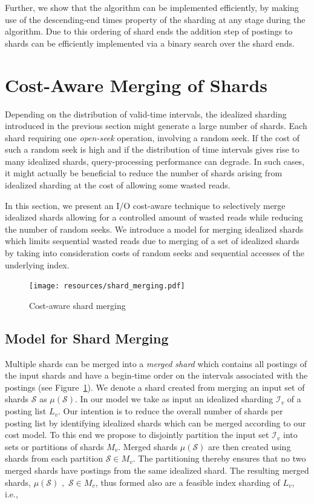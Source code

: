 Further, we show that the algorithm can be implemented efficiently, by
making use of the descending-end times property of the sharding at any stage during the algorithm. Due to this ordering of shard ends the addition step of postings to shards can be efficiently implemented via a binary search over the shard ends.

\section{Cost-Aware Merging of Shards}
\label{chap:sharding:sec:relaxed_part}

Depending on the distribution of valid-time intervals, the idealized
sharding introduced in the previous section might generate a large
number of shards. Each shard requiring one \emph{open-seek} operation, 
involving a random seek.  If the cost of such a random seek is
high and if the distribution of time intervals gives rise to many
idealized shards, query-processing performance can degrade. In such 
cases, it might actually be beneficial to reduce the number of shards 
arising from idealized sharding at the cost of allowing some wasted 
reads.
 
In this section, we present an I/O cost-aware technique to
selectively merge idealized shards allowing for a controlled amount of
wasted reads while reducing the number of random seeks. We introduce a
 model for merging idealized shards which limits sequential wasted reads due to merging of a
set of idealized shards by taking into consideration costs of random
seeks and sequential accesses of the underlying index.

\begin{figure}[tb]
	\centering
		\texttt{[image: resources/shard\_merging.pdf]}
	\caption{Cost-aware shard merging}
	 \label{fig:cas}
\end{figure}
\subsection{Model for Shard Merging}

Multiple shards can be merged into a \emph{merged shard} which contains all postings of the input shards and have a begin-time order on the intervals associated with the postings (see Figure~\ref{fig:cas}). We denote a shard created from merging an input set of shards $\mathcal{S}$ as $\mu(\mathcal{S})$. 
In our model we take as input an idealized sharding $\mathcal{I}_v$ of a posting list $L_v$. Our intention is to reduce the overall 
number of shards per posting list by identifying idealized shards which 
can be merged according to our cost model. To this end we propose to 
disjointly partition the input set $\mathcal{I}_v$ into sets or partitions of 
shards $M_v$. Merged shards $\mu(\mathcal{S})$ are then created using 
shards from each partition $\mathcal{S} \in M_v$. The partitioning 
thereby ensures that no two merged shards have postings from the same 
idealized shard. The resulting merged shards, $\mu(\mathcal{S}) \,\,, \,\, \mathcal{S} \in M_v$, thus formed also are a feasible 
index sharding of $L_v$, i.e.,

